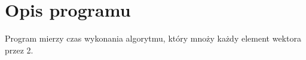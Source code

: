 \hypertarget{index_opis}{}\section{Opis programu}\label{index_opis}
Program mierzy czas wykonania algorytmu, który mnoży każdy element wektora przez 2. 